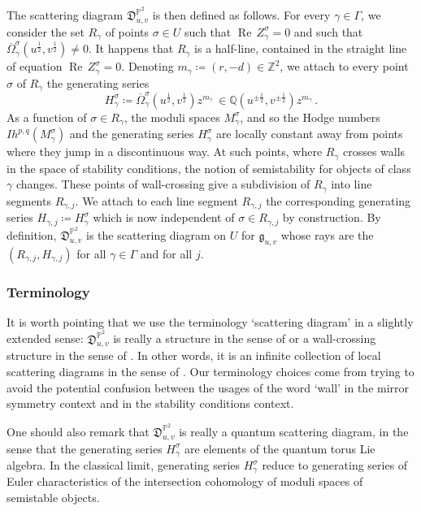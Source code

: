 \documentclass[12pt, a4paper]{amsart}
\newcommand\PP{\mathbb P}
\newcommand\Q{\mathbb Q}
\newcommand\Z{\mathbb Z}
\newcommand\fD{\mathfrak D}
\newcommand\fg{\mathfrak g}
\newcommand\Rea{\operatorname{Re}\,}
\begin{document}
The scattering diagram $\fD^{\PP^2}_{u,v}$
is then defined as follows.
For every $\gamma \in \Gamma$, we consider the set $R_\gamma$ of points $\sigma \in U$
such that $\Rea Z_\gamma^\sigma=0$ and such that 
$\overline{\Omega}_\gamma^\sigma(u^{\frac{1}{2}}, v^{\frac{1}{2}})
\neq 0$. It happens that $R_\gamma$ is a half-line, contained in the straight line of equation $\Rea Z_\gamma^\sigma =0$. Denoting 
$m_\gamma \coloneq (r,-d) \in \Z^2$,
we attach to every point $\sigma$ of $R_\gamma$ the generating series
\[H_{\gamma}^\sigma \coloneq
 \overline{\Omega}_\gamma^\sigma(u^{\frac{1}{2}}, v^{\frac{1}{2}})
z^{m_\gamma} \,\in \Q(u^{\pm\frac{1}{2}},
v^{\pm\frac{1}{2}}) z^{m_\gamma}\,.\] 
As a function of $\sigma \in R_\gamma$, the moduli spaces $M_\gamma^\sigma$, and so the Hodge numbers 
$Ih^{p,q}(M_\gamma^\sigma)$ and the generating series $H_\gamma^\sigma$ are locally constant away from points where they jump in a discontinuous way. At such points, where $R_\gamma$ crosses walls in the space of stability conditions, the notion of semistability for objects of class $\gamma$ changes. These points of wall-crossing give a subdivision of $R_\gamma$ into line segments $R_{\gamma,j}$. We attach
to each line segment $R_{\gamma,j}$ the corresponding generating series $H_{\gamma,j} \coloneq H_\gamma^\sigma$ which is now independent of $\sigma
\in R_{\gamma,j}$ by construction.
By definition, $\fD^{\PP^2}_{u,v}$ is the scattering diagram on $U$ for 
$\fg_{u,v}$ whose rays are the  
$(R_{\gamma,j}, H_{\gamma,j})$ for all $\gamma \in \Gamma$ and for all $j$.

\subsubsection{Terminology}
It is worth pointing that we use the terminology `scattering diagram' in a slightly extended sense: $\fD^{\PP^2}_{u,v}$
is really a structure in the sense of 
\cite{MR2846484} or a wall-crossing structure in the sense of \cite{MR3330788}. In other words, it is an infinite collection of local scattering diagrams in the sense of
\cite{MR2846484}. Our terminology choices come from trying to avoid the potential confusion between the usages of the word `wall' in the mirror symmetry context and in the stability conditions context. 

One should also remark that $\fD^{\PP^2}_{u,v}$ is really a quantum scattering diagram, in the sense that the generating series $H_\gamma^\sigma$ are elements of the quantum torus Lie algebra. In the classical limit, generating series $H_\gamma^\sigma$ reduce to generating series of Euler characteristics of the intersection cohomology of moduli spaces of semistable objects.
\end{document}
